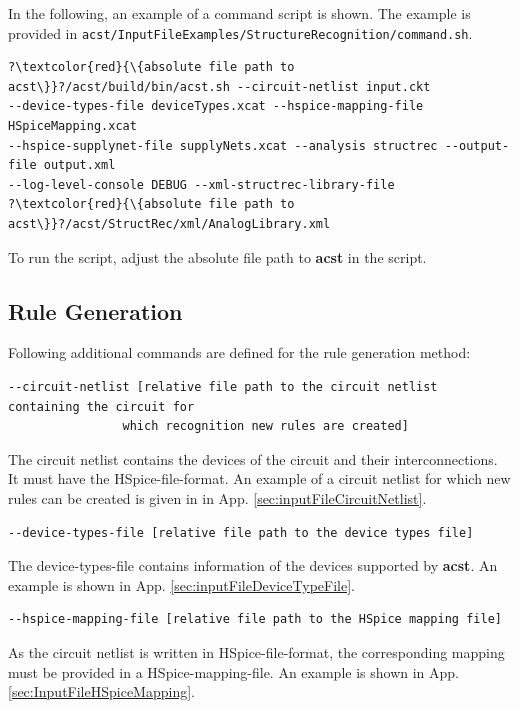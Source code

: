 In the following, an example of a command script is shown. The example is provided in {\tt acst/InputFileExamples/StructureRecognition/command.sh}.
\begin{lstlisting}[basicstyle=\ttfamily\scriptsize,backgroundcolor={\color{gray!30}}, escapechar=? ]
?\textcolor{red}{\{absolute file path to acst\}}?/acst/build/bin/acst.sh --circuit-netlist input.ckt 
--device-types-file deviceTypes.xcat --hspice-mapping-file HSpiceMapping.xcat 
--hspice-supplynet-file supplyNets.xcat --analysis structrec --output-file output.xml 
--log-level-console DEBUG --xml-structrec-library-file 
?\textcolor{red}{\{absolute file path to acst\}}?/acst/StructRec/xml/AnalogLibrary.xml 

\end{lstlisting}
To run the script, adjust the absolute file path to {\bf acst} in the script.

\subsection{Rule Generation}\label{sec:commandsRuleGeneration}
Following additional commands are defined for the rule generation method:
\\

\begin{lstlisting}[basicstyle=\ttfamily\scriptsize,backgroundcolor={\color{gray!30}}, escapechar=? ]
--circuit-netlist [relative file path to the circuit netlist containing the circuit for 
				which recognition new rules are created]
\end{lstlisting}
The circuit netlist contains the devices of the circuit and their interconnections. It must have the HSpice-file-format. An example of a circuit netlist  for which new rules can be created is given in  in App. \ref{sec:inputFileCircuitNetlist}.
\\

\begin{lstlisting}[basicstyle=\ttfamily\scriptsize,backgroundcolor={\color{gray!30}}, escapechar=? ]
--device-types-file [relative file path to the device types file]
\end{lstlisting}
The device-types-file contains information of the devices supported by {\bf acst}. An example is shown in App. \ref{sec:inputFileDeviceTypeFile}.
\\

\begin{lstlisting}[basicstyle=\ttfamily\scriptsize,backgroundcolor={\color{gray!30}}, escapechar=? ]
--hspice-mapping-file [relative file path to the HSpice mapping file]
\end{lstlisting}
As the circuit netlist is written in HSpice-file-format, the corresponding mapping must be provided in a HSpice-mapping-file. An example is shown in App. \ref{sec:InputFileHSpiceMapping}.
\\

